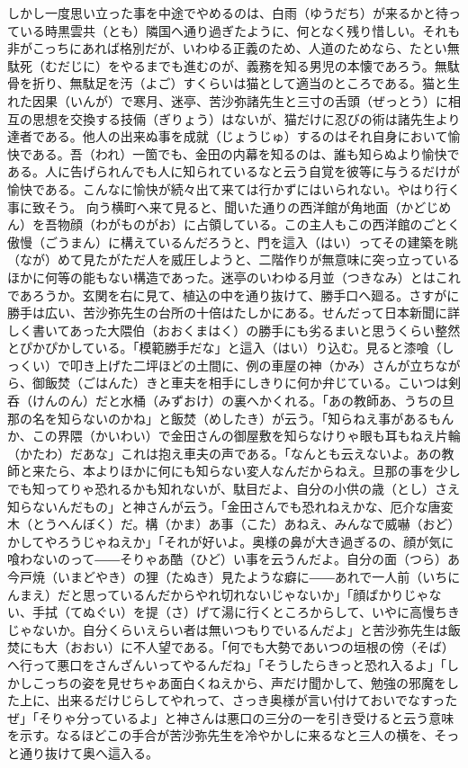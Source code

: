 \documentclass{book}
\begin{document}
しかし一度思い立った事を中途でやめるのは、白雨（ゆうだち）が来るかと待っている時黒雲共（とも）隣国へ通り過ぎたように、何となく残り惜しい。それも非がこっちにあれば格別だが、いわゆる正義のため、人道のためなら、たとい無駄死（むだじに）をやるまでも進むのが、義務を知る男児の本懐であろう。無駄骨を折り、無駄足を汚（よご）すくらいは猫として適当のところである。猫と生れた因果（いんが）で寒月、迷亭、苦沙弥諸先生と三寸の舌頭（ぜっとう）に相互の思想を交換する技倆（ぎりょう）はないが、猫だけに忍びの術は諸先生より達者である。他人の出来ぬ事を成就（じょうじゅ）するのはそれ自身において愉快である。吾（われ）一箇でも、金田の内幕を知るのは、誰も知らぬより愉快である。人に告げられんでも人に知られているなと云う自覚を彼等に与うるだけが愉快である。こんなに愉快が続々出て来ては行かずにはいられない。やはり行く事に致そう。
向う横町へ来て見ると、聞いた通りの西洋館が角地面（かどじめん）を吾物顔（わがものがお）に占領している。この主人もこの西洋館のごとく傲慢（ごうまん）に構えているんだろうと、門を這入（はい）ってその建築を眺（なが）めて見たがただ人を威圧しようと、二階作りが無意味に突っ立っているほかに何等の能もない構造であった。迷亭のいわゆる月並（つきなみ）とはこれであろうか。玄関を右に見て、植込の中を通り抜けて、勝手口へ廻る。さすがに勝手は広い、苦沙弥先生の台所の十倍はたしかにある。せんだって日本新聞に詳しく書いてあった大隈伯（おおくまはく）の勝手にも劣るまいと思うくらい整然とぴかぴかしている。「模範勝手だな」と這入（はい）り込む。見ると漆喰（しっくい）で叩き上げた二坪ほどの土間に、例の車屋の神（かみ）さんが立ちながら、御飯焚（ごはんた）きと車夫を相手にしきりに何か弁じている。こいつは剣呑（けんのん）だと水桶（みずおけ）の裏へかくれる。「あの教師あ、うちの旦那の名を知らないのかね」と飯焚（めしたき）が云う。「知らねえ事があるもんか、この界隈（かいわい）で金田さんの御屋敷を知らなけりゃ眼も耳もねえ片輪（かたわ）だあな」これは抱え車夫の声である。「なんとも云えないよ。あの教師と来たら、本よりほかに何にも知らない変人なんだからねえ。旦那の事を少しでも知ってりゃ恐れるかも知れないが、駄目だよ、自分の小供の歳（とし）さえ知らないんだもの」と神さんが云う。「金田さんでも恐れねえかな、厄介な唐変木（とうへんぼく）だ。構（かま）あ事（こた）あねえ、みんなで威嚇（おど）かしてやろうじゃねえか」「それが好いよ。奥様の鼻が大き過ぎるの、顔が気に喰わないのって――そりゃあ酷（ひど）い事を云うんだよ。自分の面（つら）あ今戸焼（いまどやき）の狸（たぬき）見たような癖に――あれで一人前（いちにんまえ）だと思っているんだからやれ切れないじゃないか」「顔ばかりじゃない、手拭（てぬぐい）を提（さ）げて湯に行くところからして、いやに高慢ちきじゃないか。自分くらいえらい者は無いつもりでいるんだよ」と苦沙弥先生は飯焚にも大（おおい）に不人望である。「何でも大勢であいつの垣根の傍（そば）へ行って悪口をさんざんいってやるんだね」「そうしたらきっと恐れ入るよ」「しかしこっちの姿を見せちゃあ面白くねえから、声だけ聞かして、勉強の邪魔をした上に、出来るだけじらしてやれって、さっき奥様が言い付けておいでなすったぜ」「そりゃ分っているよ」と神さんは悪口の三分の一を引き受けると云う意味を示す。なるほどこの手合が苦沙弥先生を冷やかしに来るなと三人の横を、そっと通り抜けて奥へ這入る。
\end{document}
